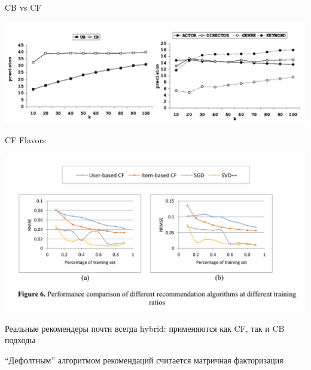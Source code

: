 \documentclass[11pt,aspectratio=169,handout=true]{beamer}
\begin{document}
\begin{frame}{CB vs CF}

\begin{center}
\includegraphics[scale=0.5]{images/comparison2.png}
\end{center}

\end{frame}

\begin{frame}{CF Flavors}

\begin{center}
\includegraphics[scale=0.5]{images/comparison.png}
\end{center}

\end{frame}

\begin{frame}

\begin{tcolorbox}[colback=info!5,colframe=info!80,title=]
Реальные рекомендеры почти всегда hybrid: применяются как CF, так и CB подходы
\end{tcolorbox}

\begin{tcolorbox}[colback=info!5,colframe=info!80,title=]
``Дефолтным'' алгоритмом рекомендаций считается матричная факторизация
\end{tcolorbox}

\end{frame}
\end{document}
